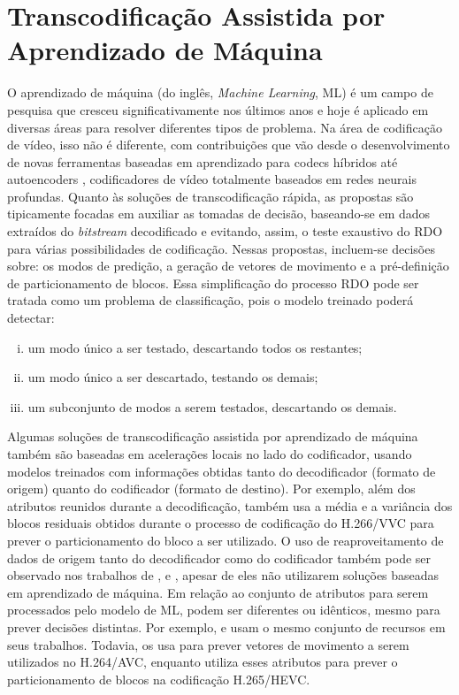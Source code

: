 \section{Transcodificação Assistida por Aprendizado de Máquina}
\label{cap:3.2}

O aprendizado de máquina (do inglês, \textit{Machine Learning}, ML) é um campo de pesquisa que cresceu significativamente nos últimos anos e hoje é aplicado em diversas áreas para resolver diferentes tipos de problema. Na área de codificação de vídeo, isso não é diferente, com contribuições que vão desde o desenvolvimento de novas ferramentas baseadas em aprendizado para codecs híbridos até autoencoders \cite{bib:autoencoder}, codificadores de vídeo totalmente baseados em redes neurais profundas. Quanto às soluções de transcodificação rápida, as propostas são tipicamente focadas em auxiliar as tomadas de decisão, baseando-se em dados extraídos do \textit{bitstream} decodificado e evitando, assim, o teste exaustivo do RDO para várias possibilidades de codificação. Nessas propostas, incluem-se decisões sobre: os modos de predição, a geração de vetores de movimento e a pré-definição de particionamento de blocos. Essa simplificação do processo RDO pode ser tratada como um problema de classificação, pois o modelo treinado poderá detectar: 

\begin{enumerate}[i.]
    \item um modo único a ser testado, descartando todos os restantes;
    
    \item um modo único a ser descartado, testando os demais;
    
    \item um subconjunto de modos a serem testados, descartando os demais.
\end{enumerate}

Algumas soluções de transcodificação assistida por aprendizado de máquina também são baseadas em acelerações locais no lado do codificador, usando modelos treinados com informações obtidas tanto do decodificador (formato de origem) quanto do codificador (formato de destino). Por exemplo, além dos atributos reunidos durante a decodificação, \citet{bib:lucas_2020} também usa a média e a variância dos blocos residuais obtidos durante o processo de codificação do H.266/VVC para prever o particionamento do bloco a ser utilizado. O uso de reaproveitamento de dados de origem tanto do decodificador como do codificador também pode ser observado nos trabalhos de \citet{bib:nguyen_2015}, \citet{bib:franche_2015} e \citet{bib:franche_2017}, apesar de eles não utilizarem soluções baseadas em aprendizado de máquina. Em relação ao conjunto de atributos para serem processados pelo modelo de ML, podem ser diferentes ou idênticos, mesmo para prever decisões distintas. Por exemplo, \citet{bib:peixoto_2014} e \citet{bib:li_2017} usam o mesmo conjunto de recursos em seus trabalhos. Todavia, \citeauthor{bib:peixoto_2014} os usa para prever vetores de movimento a serem utilizados no H.264/AVC, enquanto \citeauthor{bib:li_2017} utiliza esses atributos para prever o particionamento de blocos na codificação H.265/HEVC.

